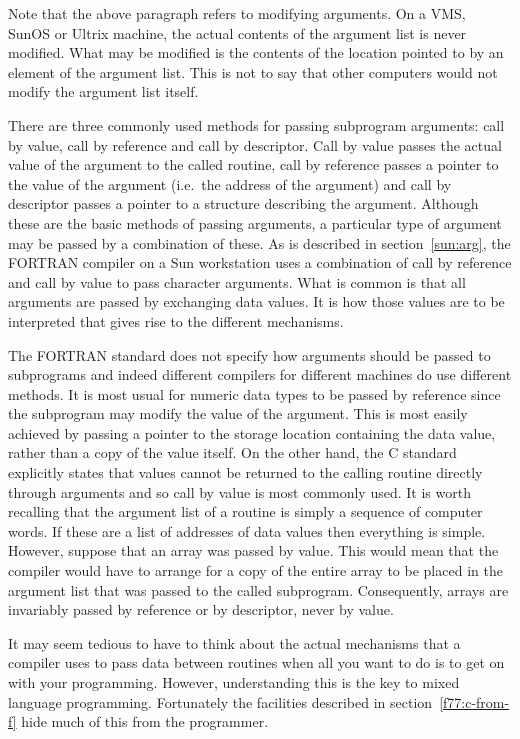 Note that the above paragraph refers to modifying arguments. On a VMS, SunOS or
Ultrix machine, the actual contents of the argument list is never modified.
What may be modified is the contents of the location pointed to by an element
of the argument list. This is not to say that other computers would not modify
the argument list itself.

There are three commonly used methods for passing subprogram arguments: call by
value, call by reference and call by descriptor. Call by value passes the
actual value of the argument to the called routine, call by reference passes a
pointer to the value of the argument (i.e.\ the address of the argument) and
call by descriptor passes a pointer to a structure describing the argument.
Although these are the basic methods of passing arguments, a particular type of
argument may be passed by a combination of these. As is described in
section~\ref{sun:arg}, the FORTRAN compiler on a Sun workstation uses a
combination of call by reference and call by value to pass character arguments.
What is common is that all arguments are passed by exchanging data values. It
is how those values are to be interpreted that gives rise to the different
mechanisms.

The FORTRAN standard does not specify how arguments should be passed to
subprograms and indeed different compilers for different machines do use
different methods. It is most usual for numeric data types to be passed by
reference since the subprogram may modify the value of the argument. This is
most easily achieved by passing a pointer to the storage location containing
the data value, rather than a copy of the value itself. On the other hand, the
C standard explicitly states that values cannot be returned to the calling
routine directly through arguments and so call by value is most commonly used.
It is worth recalling that the argument list of a routine is simply a sequence
of computer words. If these are a list of addresses of data values then
everything is simple. However, suppose that an array was passed by value. This
would mean that the compiler would have to arrange for a copy of the entire
array to be placed in the argument list that was passed to the called
subprogram. Consequently, arrays are invariably passed by reference or by
descriptor, never by value.

It may seem tedious to have to think about the actual mechanisms that a
compiler uses to pass data between routines when all you want to do is to get
on with your programming. However, understanding this is the key to mixed
language programming. Fortunately the facilities described in
section~\ref{f77:c-from-f} hide much of this from the programmer. 

